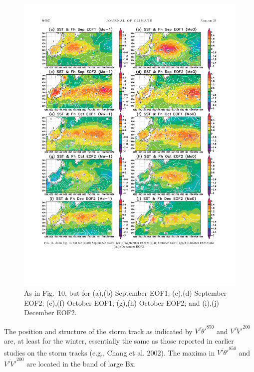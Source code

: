 \documentclass{ametsocv6.1}
\begin{document}
\begin{figure}[p]
\centerline{\includegraphics{FigTwo.pdf}}
\caption{As in Fig.~10, but for (a),(b) September EOF1; (c),(d) September EOF2; (e),(f) October EOF1; (g),(h) October EOF2; and
(i),(j) December EOF2.}\label{fig2}
\end{figure}

The position and structure of the storm track as indicated
by $\overline{V'\theta'}^{850}$
and $\overline{V'V'}^{200}$
are, at least for the winter,
essentially the same as those reported in earlier studies on
the storm tracks (e.g., Chang et al. 2002). The maxima in
$\overline{V'\theta'}^{850}$
and $\overline{V'V'}^{200}$ are located in the band of large Bx.
\end{document}
